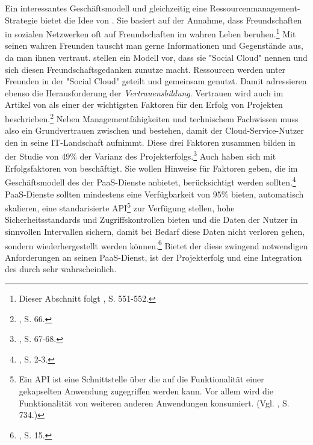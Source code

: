 \newline
Ein interessantes Geschäftsmodell und gleichzeitig eine Ressourcenmanagement-Strategie bietet die Idee von \cite{Chard.2012}. 
Sie basiert auf der Annahme, dass Freundschaften in sozialen Netzwerken oft auf Freundschaften im wahren Leben beruhen.\footnote{Dieser Abschnitt folgt \cite{Chard.2012}, S. 551-552.}
Mit seinen wahren Freunden tauscht man gerne Informationen und Gegenstände aus, da man ihnen vertraut. \cite{Chard.2012} stellen ein Modell vor, dass sie "Social Cloud" nennen und sich diesen Freundschaftsgedanken zunutze macht. Ressourcen werden unter Freunden in der "Social Cloud" geteilt und gemeinsam genutzt. Damit adressieren \cite{Chard.2012} ebenso die Herausforderung der \emph{Vertrauensbildung}.
\newline
Vertrauen wird auch im Artikel von \cite{Garrison.2012} als einer der wichtigsten Faktoren für den Erfolg von \CC Projekten beschrieben.\footnote{\cite{Garrison.2012}, S. 66.} 
Neben Managementfähigkeiten und technischem Fachwissen muss also ein Grundvertrauen zwischen \CSP und \CSU bestehen, damit der Cloud-\linebreak Service-Nutzer den \CS in seine IT-Landschaft aufnimmt. Diese drei Faktoren zusammen bilden in der Studie von \cite{Garrison.2012} 49\% der Varianz des \CC Projekterfolgs.\footnote{\cite{Garrison.2012}, S. 67-68.}
\newline
Auch \cite{Giessmann.2012} haben sich mit Erfolgsfaktoren von \CC beschäftigt. Sie wollen Hinweise für Faktoren geben, die im Geschäftsmodell des \CSPsComma der \acs{PaaS}-Dienste anbietet, berücksichtigt werden sollten.\footnote{\cite{Giessmann.2012}, S. 2-3.}
\acs{PaaS}-Dienste sollten mindestens eine Verfügbarkeit von 95\% bieten, automatisch skalieren, eine standarisierte \acs{API}\footnote{Ein \acf{API} ist eine Schnittstelle über die auf die Funktionalität einer gekapselten Anwendung zugegriffen werden kann. Vor allem wird die Funktionalität von weiteren anderen Anwendungen konsumiert. (Vgl. \cite{Sommerville.2012}, S. 734.)}
zur Verfügung stellen, hohe Sicherheitsstandards und Zugriffskontrollen bieten und die Daten der Nutzer in sinnvollen Intervallen sichern, damit bei Bedarf diese Daten nicht verloren gehen, sondern wiederhergestellt werden können.\footnote{\cite{Giessmann.2012}, S. 15.}
Bietet der \CSP diese zwingend notwendigen Anforderungen an seinen \acs{PaaS}-Dienst, ist der Projekterfolg und eine Integration des \CSs durch \CSU sehr wahrscheinlich.
\newline
